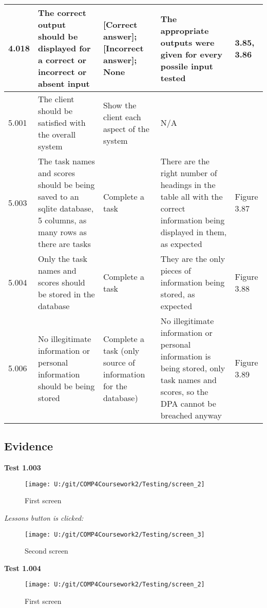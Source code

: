 \begin{landscape}
\begin{center}
\begin{longtable}{|p{2.5cm}|p{4cm}|p{4cm}|p{4.5cm}|p{3cm}|}
4.018 & The correct output should be displayed for a correct or incorrect or absent input & [Correct answer]; [Incorrect answer]; None & The appropriate outputs were given for every possile input tested & 3.85, 3.86 \\ \hline
5.001 & The client should be satisfied with the overall system & Show the client each aspect of the system & N/A & \\ \hline
5.003 & The task names and scores should be being saved to an sqlite database, 5 columns, as many rows as there are tasks & Complete a task & There are the right number of headings in the table all with the correct information being displayed in them, as expected & Figure 3.87 \\ \hline
5.004 & Only the task names and scores should be stored in the database & Complete a task & They are the only pieces of information being stored, as expected & Figure 3.88 \\ \hline
5.006 & No illegitimate information or personal information should be being stored & Complete a task (only source of information for the database) & No illegitimate information or personal information is being stored, only task names and scores, so the DPA cannot be breached anyway & Figure 3.89 \\ \hline
\end{longtable}
\end{center}

\end{landscape}

\subsection{Evidence}

\textbf{Test 1.003}

\begin{figure}[H]
    \label{fig: First Screen}\caption{First screen}
    \texttt{[image: U:/git/COMP4Coursework2/Testing/screen\_2]}
\end{figure}

\textit{Lessons button is clicked: }

\begin{figure}[H]
    \label{fig: Second Screen}\caption{Second screen}
    \texttt{[image: U:/git/COMP4Coursework2/Testing/screen\_3]}
\end{figure}

\textbf{Test 1.004}

\begin{figure}[H]
    \label{fig: First Screen}\caption{First screen}
    \texttt{[image: U:/git/COMP4Coursework2/Testing/screen\_2]}
\end{figure}

